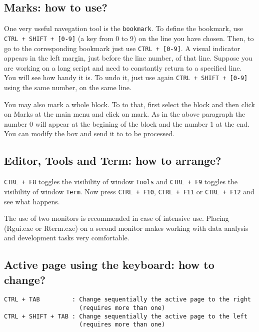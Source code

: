 \subsection{Marks: how to use?}

One very useful navegation tool is the \texttt{bookmark}. To define the bookmark,
use \texttt{CTRL + SHIFT + [0-9]} (a key from 0 to 9) on the line you have chosen.
Then, to go to the corresponding bookmark just use \texttt{CTRL + [0-9]}.
A visual indicator appears in the left margin, just before the line number, of that line.
Suppose you are working on a long script and need to constantly return to a specified line.
You will see how handy it is. To undo it, just use again \texttt{CTRL + SHIFT + [0-9]} using the same number, on the same line.

You may also mark a whole block. To to that, first select the block and then click on Marks at the main menu and click on mark.
As in the above paragraph the number 0 will appear at the begining of the block and the number 1 at the end.
You can modify the box and send it to \RR{} to be processed.

\subsection{Editor, Tools and Term: how to arrange?}

\texttt{CTRL + F8} toggles the visibility of window \texttt{Tools} and \texttt{CTRL + F9}
toggles the visibility of window \texttt{Term}. Now press \texttt{CTRL + F10},
\texttt{CTRL + F11} or \texttt{CTRL + F12} and see what happens.

The use of two monitors is recommended in case of intensive use.
Placing \RR{} (Rgui.exe or Rterm.exe) on a second monitor makes working with data analysis
and development tasks very comfortable.

\subsection{Active page using the keyboard: how to change?}

\begin{verbatim}
CTRL + TAB         : Change sequentially the active page to the right
                     (requires more than one)
CTRL + SHIFT + TAB : Change sequentially the active page to the left
                     (requires more than one)
\end{verbatim}

